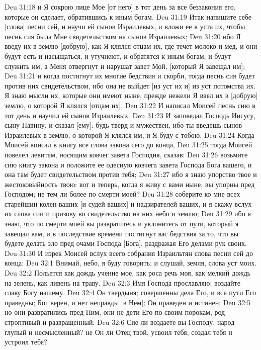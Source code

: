\vs Deu 31:18 и Я сокрою лице Мое [от него] в тот день за все беззакония его, которые он сделает, обратившись к иным богам.
\vs Deu 31:19 Итак напишите себе [слова] песни сей, и научи ей сынов Израилевых, и вложи ее в уста их, чтобы песнь сия была Мне свидетельством на сынов Израилевых;
\vs Deu 31:20 ибо Я введу их в землю [добрую], как Я клялся отцам их, где течет молоко и мед, и они будут есть и насыщаться, и утучнеют, и обратятся к иным богам, и будут служить им, а Меня отвергнут и нарушат завет Мой, [который Я завещал им];
\vs Deu 31:21 и когда постигнут их многие бедствия и скорби, тогда песнь сия будет против них свидетельством, ибо она не выйдет [из уст их и] из уст потомства их. Я знаю мысли их, которые они имеют ныне, прежде нежели Я ввел их в [добрую] землю, о которой Я клялся [отцам их].
\vs Deu 31:22 И написал Моисей песнь сию в тот день и научил ей сынов Израилевых.
\vs Deu 31:23 И заповедал Господь Иисусу, сыну Навину, и сказал [ему]: будь тверд и мужествен, ибо ты введешь сынов Израилевых в землю, о которой Я клялся им, и Я буду с тобою.
\rsbpar\vs Deu 31:24 Когда Моисей вписал в книгу все слова закона сего до конца,
\vs Deu 31:25 тогда Моисей повелел левитам, носящим ковчег завета Господня, сказав:
\vs Deu 31:26 возьмите сию книгу закона и положите ее одесную ковчега завета Господа Бога вашего, и она там будет свидетельством против тебя;
\vs Deu 31:27 ибо я знаю упорство твое и жестоковыйность твою: вот и теперь, когда я живу с вами ныне, вы упорны пред Господом; не тем ли более по смерти моей?
\vs Deu 31:28 соберите ко мне всех старейшин колен ваших [и судей ваших] и надзирателей ваших, и я скажу вслух их слова сии и призову во свидетельство на них небо и землю;
\vs Deu 31:29 ибо я знаю, что по смерти моей вы развратитесь и уклонитесь от пути, который я завещал вам, и в последствие времени постигнут вас бедствия за то, что вы будете делать зло пред очами Господа [Бога], раздражая Его делами рук своих.
\vs Deu 31:30 И изрек Моисей вслух всего собрания Израильтян слова песни сей до конца:
\vs Deu 32:1 Внимай, небо, я буду говорить; и слушай, земля, слова уст моих.
\vs Deu 32:2 Польется как дождь учение мое, как роса речь моя, как мелкий дождь на зелень, как ливень на траву.
\vs Deu 32:3 Имя Господа прославляю; воздайте славу Богу нашему.
\vs Deu 32:4 Он твердыня; совершенны дела Его, и все пути Его праведны; Бог верен, и нет неправды [в Нем]; Он праведен и истинен;
\vs Deu 32:5 но они развратились пред Ним, они не дети Его по своим порокам, род строптивый и развращенный.
\vs Deu 32:6 Сие ли воздаете вы Господу, народ глупый и несмысленный? не Он ли Отец твой,  усвоил тебя, создал тебя и устроил тебя?
